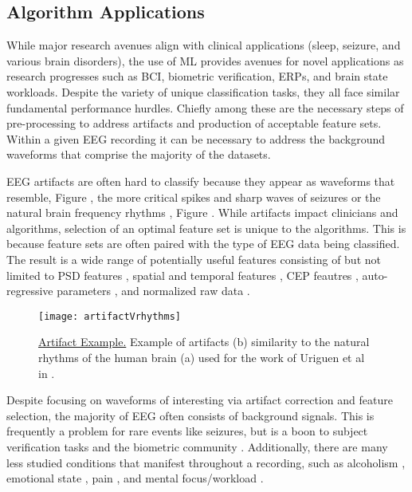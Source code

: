 \subsection{Algorithm Applications}

While major research avenues align with clinical applications (sleep, seizure, and various brain disorders), the use of \ac{ML} provides avenues for novel applications as research progresses such as \ac{BCI}, biometric verification, \acp{ERP}, and brain state workloads. Despite the variety of unique classification tasks, they all face similar fundamental performance hurdles. Chiefly among these are the necessary steps of pre-processing to address artifacts and production of acceptable feature sets. Within a given \ac{EEG} recording it can be necessary to address the background waveforms that comprise the majority of the datasets.

\ac{EEG} artifacts are often hard to classify because they appear as waveforms that resemble, Figure , the more critical spikes and sharp waves of seizures \cite{Halford2017} or the natural brain frequency rhythms \cite{Uriguen2015}, Figure . While artifacts impact clinicians and algorithms, selection of an optimal feature set is unique to the algorithms. This is because feature sets are often paired with the type of \ac{EEG} data being classified. The result is a wide range of potentially useful features consisting of but not limited to \ac{PSD} features \cite{Gui2015}, spatial and temporal features \cite{Mognon2011}, \ac{CEP} feautres \cite{Harati2015a}, auto-regressive parameters \cite{Marcano2018}, and normalized raw data \cite{Acharya2018}.

\begin{figure}
\centering
\texttt{[image: artifactVrhythms]}
\caption[Artifact Example]{\underline{Artifact Example.} Example of artifacts (b) similarity to the natural rhythms of the human brain (a) used for the work of Uriguen et al in \cite{Uriguen2015}.}
\label{fig:artifactVrhythm}
\end{figure}

Despite focusing on waveforms of interesting via artifact correction and feature selection, the majority of \ac{EEG} often consists of background signals\cite{Wulsin2011,Rakthanmanon2012,Uriguen2015}. This is frequently a problem for rare events like seizures, but is a boon to subject verification tasks and the biometric community \cite{Campisi2014}. Additionally, there are many less studied conditions that manifest throughout a recording, such as alcoholism \cite{Porjesz2005}, emotional state \cite{Coan2004}, pain \cite{Schulz2012}, and mental focus/workload \cite{Schultze-Kraft2016}.


